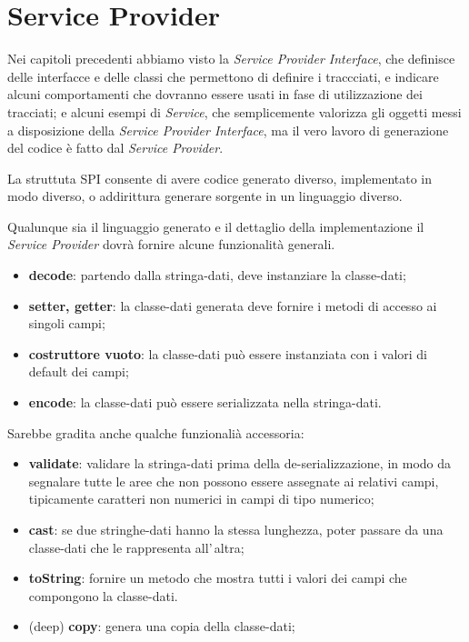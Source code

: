 \documentclass[a4paper,10pt]{report}
\begin{document}
\chapter{Service Provider}
Nei capitoli precedenti abbiamo visto la \textsl{Service Provider Interface}, 
che  definisce delle interfacce e delle classi che permettono di definire i 
traccciati, e indicare alcuni comportamenti che dovranno essere usati in fase di
utilizzazione dei tracciati; e alcuni esempi di \textsl{Service}, che
semplicemente valorizza gli oggetti messi a disposizione della 
\textsl{Service Provider Interface}, ma il vero lavoro di generazione del codice 
è fatto dal \textsl{Service Provider}.

La struttuta SPI consente di avere codice generato diverso, implementato in modo
diverso, o addirittura generare sorgente in un linguaggio diverso.

Qualunque sia il linguaggio generato e il dettaglio della implementazione il
\textsl{Service Provider} dovrà fornire alcune funzionalità generali.

\begin{itemize}
\item \textbf{decode}: partendo dalla stringa-dati, deve instanziare la 
    classe-dati;
\item \textbf{setter, getter}: la classe-dati generata deve fornire i metodi di 
    accesso ai singoli campi;
\item \textbf{costruttore vuoto}: la classe-dati può essere instanziata con i 
    valori di default dei campi;
\item \textbf{encode}: la classe-dati può essere serializzata nella 
    stringa-dati.
\end{itemize}
Sarebbe gradita anche qualche funzionalià accessoria:
\begin{itemize}
\item \textbf{validate}: validare la stringa-dati prima della 
    de-serializzazione, in modo da segnalare tutte le aree che non possono essere
    assegnate ai relativi campi, tipicamente caratteri non numerici in campi di
    tipo numerico;
\item \textbf{cast}: se due stringhe-dati hanno la stessa lunghezza, poter 
    passare da una classe-dati che le rappresenta all'\,altra;
\item \textbf{toString}: fornire un metodo che mostra tutti i valori dei campi 
    che compongono la classe-dati.
\item (deep) \textbf{copy}: genera una copia della classe-dati;
\end{itemize}
\end{document}

